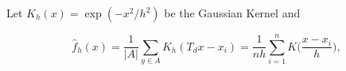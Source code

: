 Let  $K_h(x) = \exp( -x^2/h^2)$ be the Gaussian Kernel and

\[
    \hat{f}_h(x) = \frac{1}{|A|}\sum_{ y \in A} K_h (T_dx - x_i) = \frac{1}{nh} \sum_{i=1}^n K\Big(\frac{x-x_i}{h}\Big),
  \]